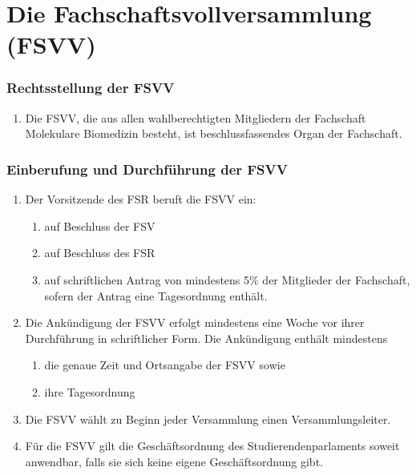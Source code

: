 \documentclass{article}
\providecommand{\tightlist}{\setlength{\itemsep}{0pt}\setlength{\parskip}{0pt}}
\begin{document}
\part{Die Fachschaftsvollversammlung (FSVV)}\label{iii.-die-fachschaftsvollversammlung-fsvv}

\section{Rechtsstellung der FSVV}\label{rechtsstellung-der-fsvv}

\begin{enumerate}[(1)]
	\item Die FSVV, die aus allen wahlberechtigten Mitgliedern der Fachschaft Molekulare Biomedizin besteht, ist beschlussfassendes Organ der Fachschaft.
\end{enumerate}

\section{Einberufung und Durchführung der FSVV}\label{einberufung-und-durchfuxfchrung-der-fsvv}

\begin{enumerate}[(1)]
	\item Der Vorsitzende des FSR beruft die FSVV ein:
	\begin{enumerate}[1.]
		\tightlist
		\item auf Beschluss der FSV
		\item auf Beschluss des FSR
		\item auf schriftlichen Antrag von mindestens 5\% der Mitglieder der Fachschaft, sofern der Antrag eine Tagesordnung enthält.
	\end{enumerate}
	\item Die Ankündigung der FSVV erfolgt mindestens eine Woche vor ihrer Durchführung in schriftlicher Form. Die Ankündigung enthält mindestens
	\begin{enumerate}[1.]
		\tightlist
		\item die genaue Zeit und Ortsangabe der FSVV sowie
		\item ihre Tagesordnung
	\end{enumerate}
	\item Die FSVV wählt zu Beginn jeder Versammlung einen Versammlungsleiter.
	\item Für die FSVV gilt die Geschäftsordnung des Studierendenparlaments soweit anwendbar, falls sie sich keine eigene Geschäftsordnung gibt.
\end{enumerate}
\end{document}
